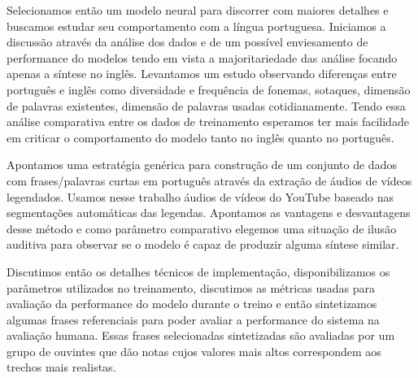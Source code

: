 Selecionamos então um modelo neural para discorrer com maiores detalhes e buscamos estudar seu comportamento com a língua portuguesa. Iniciamos a discussão através da análise dos dados e de um possível enviesamento de performance do modelos tendo em vista a majoritariedade das análise focando apenas a síntese no inglês. Levantamos um estudo observando diferenças entre português e inglês como diversidade e frequência de fonemas, sotaques, dimensão de palavras existentes, dimensão de palavras usadas cotidianamente. Tendo essa análise comparativa entre os dados de treinamento esperamos ter mais facilidade em criticar o comportamento do modelo tanto no inglês quanto no português.

Apontamos uma estratégia genérica para construção de um conjunto de dados com frases/palavras curtas em português através da extração de áudios de vídeos legendados. Usamos nesse trabalho áudios de vídeos do YouTube baseado nas segmentações automáticas das legendas. Apontamos as vantagens e desvantagens desse método e como parâmetro comparativo elegemos uma situação de ilusão auditiva \cite{auditory_illusion} para observar se o modelo é capaz de produzir alguma síntese similar. 

Discutimos então os detalhes técnicos de implementação, disponibilizamos os parâmetros utilizados no treinamento, discutimos as métricas usadas para avaliação da performance do modelo durante o treino e então sintetizamos algumas frases referenciais para poder avaliar a performance do sistema na avaliação humana. Essas frases selecionadas sintetizadas são avaliadas por um grupo de ouvintes que dão notas cujos valores mais altos correspondem aos trechos mais realistas.
